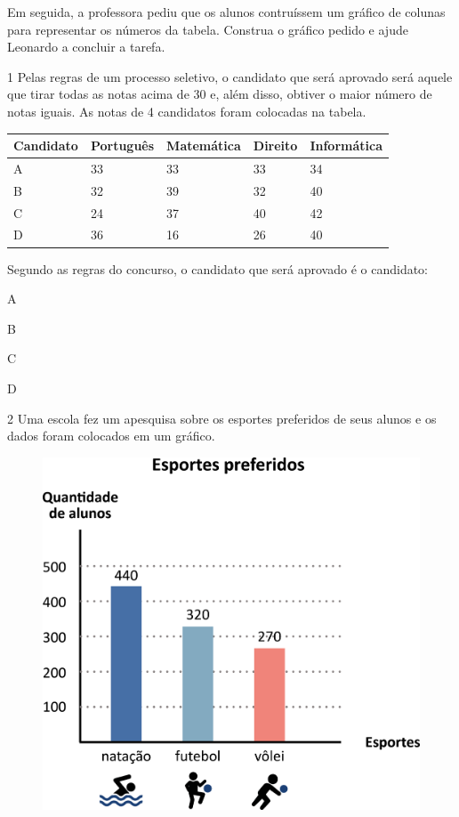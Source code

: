 Em seguida, a professora pediu que os alunos contruíssem um gráfico de
colunas para representar os números da tabela. Construa o gráfico pedido
e ajude Leonardo a concluir a tarefa.

\begin{mdframed}[linewidth=2pt,linecolor=salmao]
\vspace{6.5cm}
\end{mdframed}


\num{1} Pelas regras de um processo seletivo, o candidato que será aprovado será
aquele que tirar todas as notas acima de 30 e, além disso, obtiver o maior
número de notas iguais. As notas de 4 candidatos foram colocadas na
tabela.

\begin{longtable}[]{@{}lllll@{}}
\toprule
Candidato & Português & Matemática & Direito &
Informática\tabularnewline
\midrule
\endhead
A & 33 & 33 & 33 & 34\tabularnewline
B & 32 & 39 & 32 & 40\tabularnewline
C & 24 & 37 & 40 & 42\tabularnewline
D & 36 & 16 & 26 & 40\tabularnewline
\bottomrule
\end{longtable}

Segundo as regras do concurso, o candidato que será aprovado é o
candidato:

\begin{escolha}
\item
  A
\item
  B
\item
  C
\item
  D
\end{escolha}

\num{2} Uma escola fez um apesquisa sobre os esportes preferidos de seus alunos
e os dados foram colocados em um gráfico.

\pagebreak
\begin{figure}[htpb!]
\centering
\includegraphics[width=.6\textwidth]{./media/image90.png}
\end{figure}


